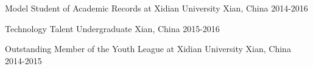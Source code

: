 
\begin{cvhonors}
	
	 \cvhonor
	{Model Student of Academic Records at Xidian University } %
	{} %
	{Xian, China} %
	{2014-2016} %

	\cvhonor
	{Technology Talent Undergraduate} %
	{} %
	{Xian, China} %
	{2015-2016} %
	
	\cvhonor
	{Outstanding Member of the Youth League at Xidian University} %
	{} %
	{Xian, China} %
	{2014-2015} %
	
\end{cvhonors}





